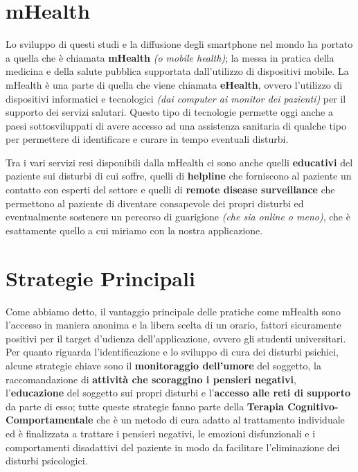 \section{mHealth}
Lo sviluppo di questi studi e la diffusione degli smartphone nel mondo ha portato a quella che è chiamata \textbf{mHealth} \textit{(o mobile health)}; la messa in pratica della medicina e della salute pubblica supportata dall'utilizzo di dispositivi mobile\cite{mHealth}.
La mHealth è una parte di quella che viene chiamata \textbf{eHealth}, ovvero l'utilizzo di dispositivi informatici e tecnologici \textit{(dai computer ai monitor dei pazienti)} per il supporto dei servizi salutari.
Questo tipo di tecnologie permette oggi anche a paesi sottosviluppati di avere accesso ad una assistenza sanitaria di qualche tipo per permettere di identificare e curare in tempo eventuali disturbi.

Tra i vari servizi resi disponibili dalla mHealth ci sono anche quelli \textbf{educativi} del paziente sui disturbi di cui soffre, quelli di \textbf{helpline} che forniscono al paziente un contatto con esperti del settore e quelli di \textbf{remote disease surveillance} che permettono al paziente di diventare consapevole dei propri disturbi ed eventualmente sostenere un percorso di guarigione \textit{(che sia online o meno)}, che è esattamente quello a cui miriamo con la nostra applicazione.

\section{Strategie Principali}
Come abbiamo detto, il vantaggio principale delle pratiche come mHealth sono l'accesso in
maniera anonima e la libera scelta di un orario, fattori sicuramente positivi per il target d'udienza dell'applicazione, ovvero gli studenti universitari.
Per quanto riguarda l'identificazione e lo sviluppo di cura dei disturbi psichici, alcune strategie chiave sono il \textbf{monitoraggio dell'umore} del soggetto, la raccomandazione di \textbf{attività che scoraggino i pensieri negativi}, l'\textbf{educazione} del soggetto sui propri disturbi e l'\textbf{accesso alle reti di supporto} da parte di esso; tutte queste strategie fanno parte della \textbf{Terapia Cognitivo-Comportamentale}\cite{CBT} che è un metodo di cura adatto al trattamento individuale ed è finalizzata a trattare i pensieri negativi, le emozioni disfunzionali e i comportamenti disadattivi del paziente in modo da facilitare l'eliminazione dei disturbi psicologici.

